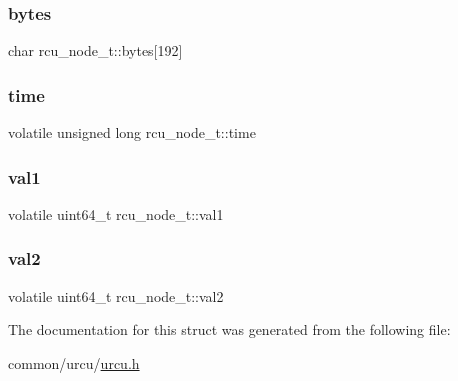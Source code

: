 \subsubsection{\texorpdfstring{bytes}{bytes}}
{\footnotesize\ttfamily char rcu\+\_\+node\+\_\+t\+::bytes\mbox{[}192\mbox{]}}

\mbox{\label{structrcu__node__t_a760b5d954e54c86bc09dc1e2754c0307}} 
\subsubsection{\texorpdfstring{time}{time}}
{\footnotesize\ttfamily volatile unsigned long rcu\+\_\+node\+\_\+t\+::time}

\mbox{\label{structrcu__node__t_a39f0899a55b266866a7dddd8dac507b4}} 
\subsubsection{\texorpdfstring{val1}{val1}}
{\footnotesize\ttfamily volatile uint64\+\_\+t rcu\+\_\+node\+\_\+t\+::val1}

\mbox{\label{structrcu__node__t_a37089d9851c8b558fea850ebec84eea8}} 
\subsubsection{\texorpdfstring{val2}{val2}}
{\footnotesize\ttfamily volatile uint64\+\_\+t rcu\+\_\+node\+\_\+t\+::val2}



The documentation for this struct was generated from the following file\+:\begin{DoxyCompactItemize}
\item 
common/urcu/\hyperlink{urcu_8h}{urcu.\+h}\end{DoxyCompactItemize}
